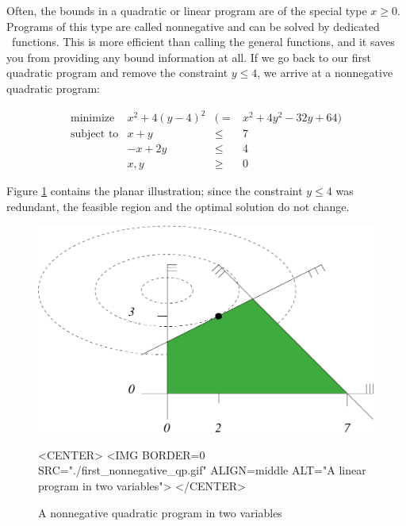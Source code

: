 Often, the bounds in a quadratic or linear program are of the special
type $x\geq 0$. Programs of this type are called nonnegative and
can be solved by dedicated \cgal\ functions. This is more efficient than
calling the general functions, and it saves you from providing any bound
information at all. If we go back to our first quadratic program and
remove the constraint $y\leq 4$, we arrive at a nonnegative quadratic
program: 

\[
\begin{array}{lrcl}
\mbox{minimize}       & x^2 + 4(y-4)^2 &(=& x^2 + 4y^2 - 32y + 64) \\
\mbox{subject to}     & x + y &\leq& 7 \\
                      & -x + 2y &\leq& 4 \\
                      & x,y &\geq& 0
\end{array}
\]

Figure \ref{fig:QP-first_nonnegative_qp} contains 
the planar illustration; since the constraint $y\leq 4$ was 
redundant, the feasible region and the optimal solution do 
not change. 

\begin{figure}[htbp]
\begin{ccTexOnly}
\begin{center}
\includegraphics{QP_solver/first_nonnegative_qp} 
\end{center}
\end{ccTexOnly}

\begin{ccHtmlOnly}
<CENTER>
<IMG BORDER=0 SRC="./first_nonnegative_qp.gif" ALIGN=middle ALT="A linear program in two variables">
</CENTER>
\end{ccHtmlOnly}

\caption{A nonnegative quadratic program in two variables
\label{fig:QP-first_nonnegative_qp}}
\end{figure}

